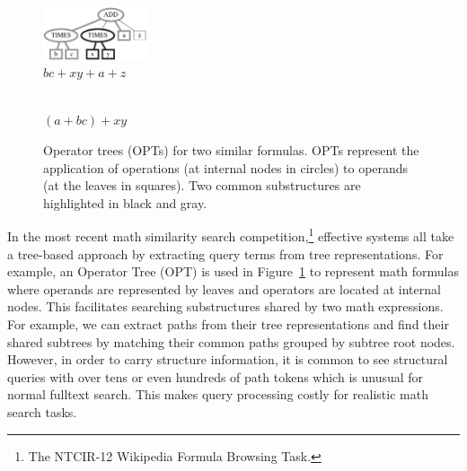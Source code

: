 \documentclass[runningheads]{llncs}
\begin{document}
\begin{figure}[!t]

\begin{center}
\begin{minipage}[b]{1.5in}
\begin{center}
\includegraphics[width=1.2in]{fig/tree3.eps}\\
$bc + xy + a + z$
\end{center}
\end{minipage}
\hspace*{.0in}
\begin{minipage}[b]{1.5in}
\begin{center}
\\
$(a + bc) + xy$
\end{center}
\end{minipage}
\end{center}

\caption{Operator trees (OPTs) for two similar formulas. OPTs represent the application of operations (at internal nodes in circles) to operands (at the leaves in squares). Two common substructures are highlighted in black and gray.}
\label{intro}
\end{figure}

In the most recent math similarity search competition,\footnote{The NTCIR-12 Wikipedia Formula Browsing Task.} effective systems all take a tree-based approach by extracting query terms from tree representations.
For example, an Operator Tree (OPT) is used in Figure~\ref{intro} to represent math formulas where operands are represented by leaves and operators are located at internal nodes.
This facilitates searching substructures shared by two math expressions. For example, we can extract paths from their tree representations and find their shared subtrees by matching their common paths grouped by subtree root nodes. 
However, in order to carry structure information, it is common to see structural queries with over tens or even hundreds of path tokens which is unusual for normal fulltext search. This makes query processing costly for realistic math search tasks.
\end{document}
